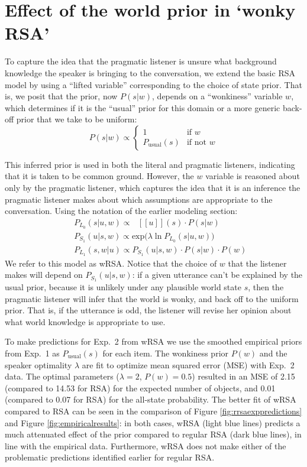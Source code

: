 \documentclass[10pt,letterpaper]{article}
\newcommand{\denote}[1]{\mbox{ $[\![ #1 ]\!]$}}
\newcommand{\figref}[1]{Figure \ref{#1}}
\begin{document}
\section{Effect of the world prior in `wonky RSA'}

To capture the idea that the pragmatic listener is unsure what background knowledge the speaker is bringing to the conversation, we extend the basic RSA model by using a ``lifted variable'' \cite{goodmanlassiter,lassiter2013,bergengoodman2012,kao2014} corresponding to the choice of state prior. That is, we posit that the prior, now $P(s|w)$, depends on a ``wonkiness'' variable $w$, which determines if it is the ``usual'' prior for this domain or a more generic back-off prior that we take to be uniform:
$$
P(s|w) \propto \begin{cases}
1  & \text{if } w\\
   P_{\text{usual}}(s) & \text{if not } w
  \end{cases}
  $$
  
This inferred prior is used in both the literal and pragmatic listeners, indicating that it is taken to be common ground. However, the $w$ variable is reasoned about only by the pragmatic listener, which captures the idea that it is an inference the pragmatic listener makes about which assumptions are appropriate to the conversation. Using the notation of the earlier modeling section:
\begin{eqnarray}
&&P_{L_0}(s|u,w)\propto \denote{u}(s) \cdot P(s|w)\\
&&P_{S_1}(u|s,w) \propto \mathrm{exp}({\lambda \ln P_{L_0}(s|u,w))}\\
&&P_{L_1}(s,w|u)\propto P_{S_1}(u|s,w)\cdot P(s|w) \cdot P(w)
\end{eqnarray}
We refer to this model as wRSA. Notice that the choice of $w$ that the listener makes will depend on $P_{S_1}(u|s,w)$: if a given utterance can't be explained by the usual prior, because it is unlikely under any plausible world state $s$, then the pragmatic listener will infer that the world is wonky, and back off to the uniform prior.
That is, if the utterance is odd, the listener will revise her opinion about what world knowledge is appropriate to use.

To make predictions for Exp.~2 from wRSA we use the smoothed empirical priors from Exp.~1 as $P_{\text{usual}}(s)$ for each item. The wonkiness prior $P(w)$ and the speaker optimality $\lambda$ are fit to optimize mean squared error (MSE) with Exp.~2 data. The optimal parameters ($\lambda = 2$, $P(w) = 0.5$) resulted in an MSE of 2.15 (compared to 14.53 for RSA) for the expected number of objects, and 0.01 (compared to 0.07 for RSA) for the all-state probability. The better fit of wRSA compared to RSA can be seen in the comparison of \figref{fig:rrsaexppredictions} and \figref{fig:empiricalresults}: in both cases, wRSA (light blue lines) predicts a much attenuated effect of the prior compared to regular RSA (dark blue lines), in line with the empirical data. Furthermore, wRSA does not make either of the problematic predictions identified earlier for regular RSA.
\end{document}
